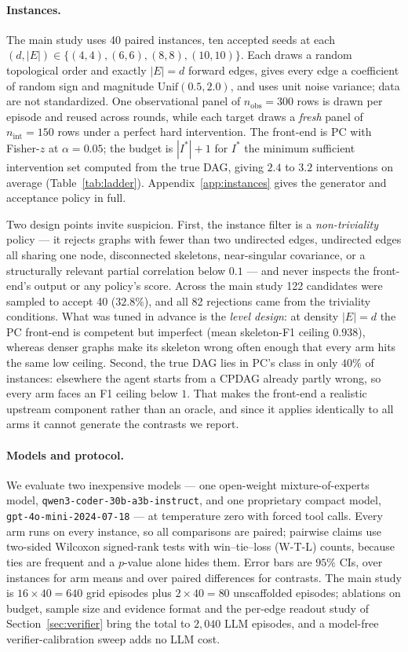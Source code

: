 \documentclass{article}
\begin{document}
\paragraph{Instances.}
The main study uses 40 paired instances, ten accepted seeds at each $(d,|E|) \in
\{(4,4),(6,6),(8,8),(10,10)\}$. Each draws a random topological order and exactly $|E|=d$
forward edges, gives every edge a coefficient of random sign and magnitude
$\mathrm{Unif}(0.5,2.0)$, and uses unit noise variance; data are not standardized. One
observational panel of $n_{\mathrm{obs}}=300$ rows is drawn per episode and reused across
rounds, while each target draws a \emph{fresh} panel of $n_{\mathrm{int}}=150$ rows under a
perfect hard intervention. The front-end is PC with Fisher-$z$ at $\alpha=0.05$; the budget is
$|I^*|+1$ for $I^*$ the minimum sufficient intervention set computed from the true DAG, giving
$2.4$ to $3.2$ interventions on average (Table~\ref{tab:ladder}).
Appendix~\ref{app:instances} gives the generator and acceptance policy in full.

Two design points invite suspicion. First, the instance filter is a \emph{non-triviality} policy
--- it rejects graphs with fewer than two undirected edges, undirected edges all sharing one
node, disconnected skeletons, near-singular covariance, or a structurally relevant partial
correlation below $0.1$ --- and never inspects the front-end's output or any policy's score.
Across the main study 122 candidates were sampled to accept 40 ($32.8\%$), and all 82 rejections
came from the triviality conditions. What was tuned in advance is the \emph{level design}: at
density $|E|=d$ the PC front-end is competent but imperfect (mean skeleton-F1 ceiling $0.938$),
whereas denser graphs make its skeleton wrong often enough that every arm hits the same low
ceiling. Second, the true DAG lies in PC's class in only $40\%$ of instances: elsewhere the agent
starts from a CPDAG already partly wrong, so every arm faces an F1 ceiling below $1$. That makes
the front-end a realistic upstream component rather than an oracle, and since it applies
identically to all arms it cannot generate the contrasts we report.

\paragraph{Models and protocol.}
We evaluate two inexpensive models --- one open-weight mixture-of-experts model,
\texttt{qwen3-coder-30b-a3b-instruct}, and one proprietary compact model,
\texttt{gpt-4o-mini-2024-07-18} --- at temperature zero with forced tool calls. Every arm runs
on every instance, so all comparisons are paired; pairwise claims use two-sided Wilcoxon
signed-rank tests with win--tie--loss (W-T-L) counts, because ties are frequent and a
$p$-value alone hides them. Error bars are $95\%$ CIs, over instances for arm means and over
paired differences for contrasts. The main study is $16 \times 40 = 640$ grid episodes plus
$2 \times 40 = 80$ unscaffolded episodes; ablations on budget, sample size and evidence format
and the per-edge readout study of Section~\ref{sec:verifier} bring the total to $2{,}040$ LLM
episodes, and a model-free verifier-calibration sweep adds no LLM cost.
\end{document}
